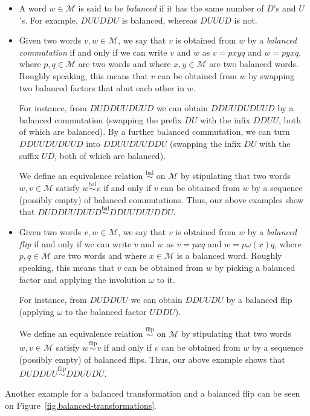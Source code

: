 \documentclass[numbers=enddot,12pt,final,onecolumn,notitlepage]{scrartcl}%
\theoremstyle{definition}
\newcommand{\M}{\mathcal{M}}
\newcommand{\balsim}{\overset{\operatorname*{bal}}{\sim}}
\newcommand{\flipsim}{\overset{\operatorname*{flip}}{\sim}}
\newcommand{\tup}[1]{\left( #1 \right)}
\begin{document}
\begin{itemize}
\item A word $w\in\M$ is said to be \emph{balanced} if it has the
same number of $D$'s and $U$'s. For example, $DUUDDU$ is balanced, whereas
$DUUUD$ is not.

\item Given two words $v,w\in\M$, we say that $v$ is obtained from
$w$ by a \emph{balanced commutation} if and only if we can write $v$ and $w$
as $v=pxyq$ and $w=pyxq$, where $p,q\in\M$ are two words and where
$x,y\in\M$ are two balanced words. Roughly speaking, this means that
$v$ can be obtained from $w$ by swapping two balanced factors that abut each
other in $w$.

For instance, from $DUDDUUDUUD$ we can obtain $DDUUDUDUUD$ by a balanced
commutation (swapping the prefix $DU$ with the infix $DDUU$, both of which are
balanced). By a further balanced commutation, we can turn $DDUUDUDUUD$ into
$DDUUDUUDDU$ (swapping the infix $DU$ with the suffix $UD$, both of which are balanced).

We define an equivalence relation $\balsim$ on
$\M$ by stipulating that two words $w,v\in\M$ satisfy
$w \balsim v$ if and only if $v$ can be obtained
from $w$ by a sequence (possibly empty) of balanced commutations. Thus, our above 
examples show that $DUDDUUDUUD \balsim DDUUDUUDDU$.

\item Given two words $v,w\in\M$, we say that $v$ is obtained from
$w$ by a \emph{balanced flip} if and only if we can write $v$ and $w$
as $v=pxq$ and $w=p\omega\tup{x}q$, where $p,q\in\M$ are two words
and where $x \in \M$ is a balanced word. Roughly speaking, this means
that $v$ can be obtained from $w$ by picking a balanced factor and applying
the involution $\omega$ to it.

For instance, from $DUDDUU$ we can obtain $DDUUDU$ by a balanced
flip (applying $\omega$ to the balanced factor $UDDU$).

We define an equivalence relation $\flipsim$ on
$\M$ by stipulating that two words $w,v\in\M$ satisfy
$w \flipsim v$ if and only if $v$ can be obtained
from $w$ by a sequence (possibly empty) of balanced flips. Thus, our above 
example shows that $DUDDUU \flipsim DDUUDU$.

\end{itemize}

Another example for a balanced transformation and a balanced flip can be seen on Figure~\ref{fig.balanced-transformations}.
\end{document}
